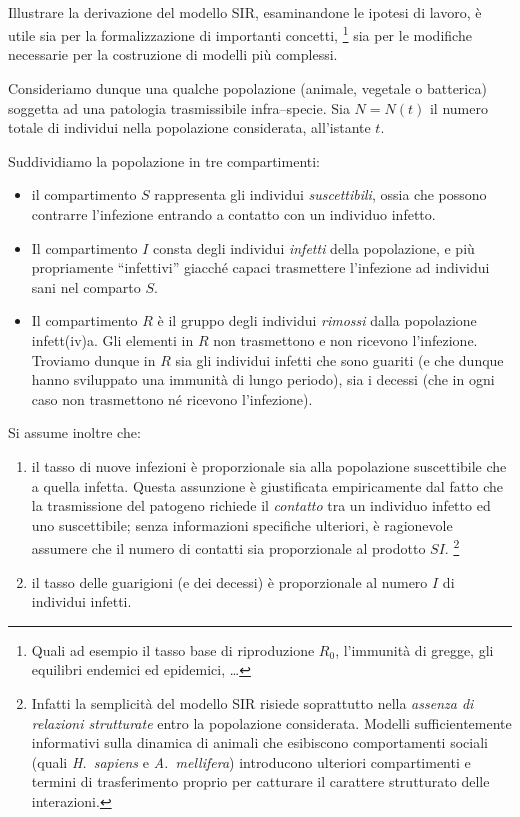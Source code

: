 \paragraph{}
Illustrare la derivazione del modello SIR, esaminandone le ipotesi di lavoro, è utile sia per la formalizzazione
di importanti concetti,
\footnote{Quali ad esempio il tasso base di riproduzione $R_0$, l'immunità di gregge, gli
equilibri endemici ed epidemici, \dots}
sia per le modifiche necessarie per la costruzione di modelli più complessi.

Consideriamo dunque una qualche popolazione (animale, vegetale o batterica) soggetta ad una patologia trasmissibile
infra--specie. Sia $N =N(t)$ il numero totale di individui nella popolazione considerata, all'istante $t$.

Suddividiamo la popolazione in tre compartimenti:
\begin{itemize}
    \item il compartimento $S$ rappresenta gli individui \emph{suscettibili}, ossia che possono contrarre
        l'infezione entrando a contatto con un individuo infetto.
    \item Il compartimento $I$ consta degli individui \emph{infetti} della popolazione, e più propriamente
        ``infettivi'' giacché capaci trasmettere l'infezione ad individui sani nel comparto $S$.
    \item Il compartimento $R$ è il gruppo degli individui \emph{rimossi} dalla popolazione infett(iv)a.
        Gli elementi in $R$ non trasmettono e non ricevono l'infezione. Troviamo dunque in $R$ sia gli individui
        infetti che sono guariti (e che dunque hanno sviluppato una immunità di lungo periodo), sia i decessi (che
        in ogni caso non trasmettono né ricevono l'infezione).
\end{itemize}

Si assume inoltre che:
\begin{enumerate}
    \item il tasso di nuove infezioni è proporzionale sia alla popolazione suscettibile che a quella infetta.
        Questa assunzione è giustificata empiricamente dal fatto che la trasmissione del patogeno richiede il
        \emph{contatto} tra un individuo infetto ed uno suscettibile; senza informazioni specifiche ulteriori,
        è ragionevole assumere che il numero di contatti sia proporzionale al prodotto $SI$.
        \footnote{Infatti la semplicità del modello SIR risiede soprattutto nella \emph{assenza di relazioni
            strutturate} entro la popolazione considerata. Modelli sufficientemente informativi sulla dinamica
            di animali che esibiscono comportamenti sociali (quali \emph{H.~sapiens} e \emph{A.~mellifera})
            introducono ulteriori compartimenti e termini di trasferimento proprio per catturare il carattere
            strutturato delle interazioni.}
    \item il tasso delle guarigioni (e dei decessi) è proporzionale al numero $I$ di individui infetti.
\end{enumerate}

